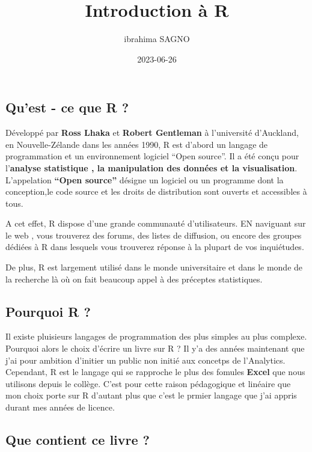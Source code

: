 \documentclass[
]{article}
\title{Introduction à R}
\author{ibrahima SAGNO}
\date{2023-06-26}
\begin{document}
\maketitle

{
\setcounter{tocdepth}{2}
\tableofcontents
}
\hypertarget{quest---ce-que-r}{%
\subsection{Qu'est - ce que R ?}\label{quest---ce-que-r}}

Développé par \textbf{Ross Lhaka} et \textbf{Robert Gentleman} à
l'université d'Auckland, en Nouvelle-Zélande dans les années 1990, R est
d'abord un langage de programmation et un environnement logiciel ``Open
source''. Il a été conçu pour l'\textbf{analyse statistique , la
manipulation des données et la visualisation}. L'appelation
\textbf{``Open source''} désigne un logiciel ou un programme dont la
conception,le code source et les droits de distribution sont ouverts et
accessibles à tous.

A cet effet, R dispose d'une grande communauté d'utilisateurs. EN
naviguant sur le web , vous trouverez des forums, des listes de
diffusion, ou encore des groupes dédiées à R dans lesquels vous
trouverez réponse à la plupart de vos inquiétudes.

De plus, R est largement utilisé dans le monde universitaire et dans le
monde de la recherche là où on fait beaucoup appel à des préceptes
statistiques.

\hypertarget{pourquoi-r}{%
\subsection{Pourquoi R ?}\label{pourquoi-r}}

Il existe pluisieurs langages de programmation des plus simples au plus
complexe. Pourquoi alors le choix d'écrire un livre sur R ? Il y'a des
années maintenant que j'ai pour ambition d'initier un public non initié
aux concetps de l'Analytics. Cependant, R est le langage qui se
rapproche le plus des fomules \textbf{Excel} que nous utilisons depuis
le collège. C'est pour cette raison pédagogique et linéaire que mon
choix porte sur R d'autant plus que c'est le prmier langage que j'ai
appris durant mes années de licence.

\hypertarget{que-contient-ce-livre}{%
\subsection{Que contient ce livre ?}\label{que-contient-ce-livre}}
\end{document}
